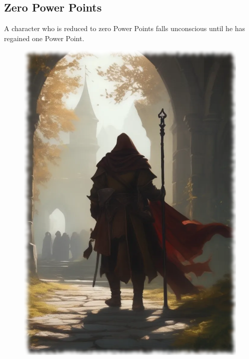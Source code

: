 \subsection{Zero Power Points}
A character who is reduced to zero Power Points falls unconscious until he has regained one Power Point.

\vspace{1em}

\begin{figure}[h]
\begin{center}
\includegraphics[scale=0.34]{img/ai-images/wizard-from-behind.png}
\end{center}
\end{figure}

